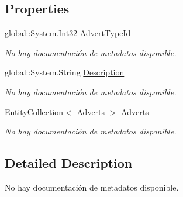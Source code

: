 \subsection*{Properties}
\begin{DoxyCompactItemize}
\item 
global\-::\-System.\-Int32 \hyperlink{class_game_memory_1_1_advert_types_ac21bad53ca69cb06497c450799dbeb43}{Advert\-Type\-Id}
\begin{DoxyCompactList}\small\item\em No hay documentación de metadatos disponible. \end{DoxyCompactList}\item 
global\-::\-System.\-String \hyperlink{class_game_memory_1_1_advert_types_af676476a49a59ae0784817869e6f0a26}{Description}
\begin{DoxyCompactList}\small\item\em No hay documentación de metadatos disponible. \end{DoxyCompactList}\item 
Entity\-Collection$<$ \hyperlink{class_game_memory_1_1_adverts}{Adverts} $>$ \hyperlink{class_game_memory_1_1_advert_types_a36bf93fbe09421a21be95837059d0211}{Adverts}
\begin{DoxyCompactList}\small\item\em No hay documentación de metadatos disponible. \end{DoxyCompactList}\end{DoxyCompactItemize}


\subsection{Detailed Description}
No hay documentación de metadatos disponible. 



